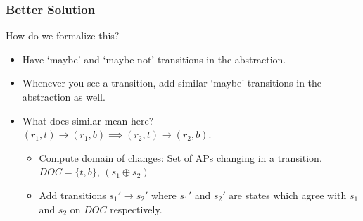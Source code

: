 \documentclass{beamer}
\begin{document}
	\begin{frame}
		\frametitle{Better Solution}
		How do we formalize this? \\ \pause
		\begin{itemize}
			\item Have `maybe' and `maybe not' transitions in the abstraction.\\
			\item Whenever you see a transition, add similar `maybe' transitions in the abstraction as well.
			\item What does similar mean here?\\
			$(r_1, t) \rightarrow (r_1, b) \implies (r_2, t) \rightarrow (r_2,b)$. \\
			\begin{itemize}
				\item Compute domain of changes: Set of APs changing in a transition.\\
				$DOC = \{t,b\}$, $(s_1 \oplus s_2)$
				\item Add transitions $s_1' \rightarrow s_2'$ where $s_1'$ and $s_2'$ are states which agree with $s_1$ and $s_2$ on $DOC$ respectively.
			\end{itemize}
		\end{itemize}
	\end{frame}
	
\end{document}
